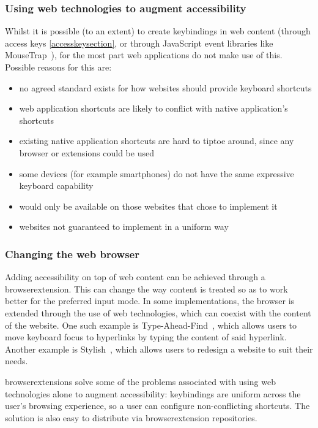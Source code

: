 \documentclass[a4paper, 12pt]{report}
\begin{document}
\subsubsection{Using web technologies to augment accessibility}
  Whilst it is possible (to an extent) to create \glspl{keybinding} in web content (through access keys \cref{accesskeysection}, or through JavaScript event libraries like MouseTrap~\cite{Mousetrap}), for the most part web applications do not make use of this. Possible reasons for this are:

\begin{itemize}
 \item no agreed standard exists for how websites should provide keyboard shortcuts
 \item web application shortcuts are likely to conflict with native application's shortcuts
 \item existing native application shortcuts are hard to tiptoe around, since any browser or extensions could be used
 \item some devices (for example smartphones) do not have the same expressive keyboard capability
 \item would only be available on those websites that chose to implement it
 \item websites not guaranteed to implement in a uniform way
\end{itemize}

\subsubsection{Changing the web browser}
\label{changingwebbrowser}
Adding accessibility on top of web content can be achieved through a \gls{browserextension}. This can change the way content is treated so as to work better for the preferred input mode. In some implementations, the browser is extended through the use of web technologies, which can coexist with the content of the website.
One such example is Type-Ahead-Find~\cite{typeaheadfind}, which allows users to move keyboard focus to hyperlinks by typing the content of said hyperlink. Another example is Stylish~\cite{stylish}, which allows users to redesign a website to suit their needs.

\Glspl{browserextension} solve some of the problems associated with using web technologies alone to augment accessibility: \glspl{keybinding} are uniform across the user's browsing experience, so a user can configure non-conflicting shortcuts. The solution is also easy to distribute via \gls{browserextension} repositories.
\end{document}
